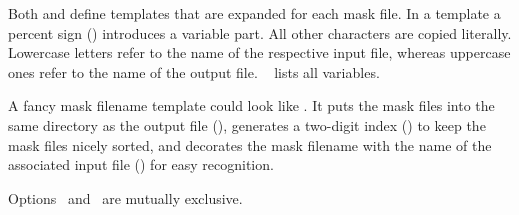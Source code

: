 \begin{codelist}
    Both  and 
    define templates that are expanded for each mask file.  In a template a percent sign
    (\sample{\%}) introduces a variable part.  All other characters are copied literally.
    Lowercase letters refer to the name of the respective input file, whereas uppercase ones
    refer to the name of the output file.  \tableName~
    lists all variables.

    A fancy mask filename template could look like .  It puts the
    mask files into the same directory as the output file (), generates a two-digit
    index () to keep the mask files nicely sorted, and decorates the mask filename
    with the name of the associated input file () for easy recognition.

    Options~ and~ are mutually exclusive.
\fi
\end{codelist}


\ifenfuse
  
\fi



